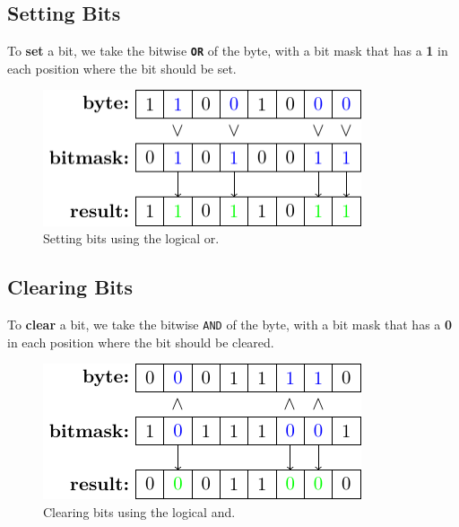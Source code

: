 \documentclass{report}
\newcommand{\keywordinline}[1]{\textcolor[rgb]{0.00,0.50,0.00}{\textbf{\texttt{#1}}}}
\begin{document}
\subsection{Setting Bits}
To \textbf{set} a bit, we take the bitwise \keywordinline{OR} of the byte, with a bit mask
that has a \textbf{1} in each position where the bit should be set.
\begin{figure}[H]
    \centering
    \includegraphics[height = 4cm, keepaspectratio = true]{figures/bit_set.pdf}
    \caption{Setting bits using the logical or.} %
\end{figure}
\subsection{Clearing Bits}
To \textbf{clear} a bit, we take the bitwise \texttt{AND} of the byte, with a bit mask
that has a \textbf{0} in each position where the bit should be cleared.
\begin{figure}[H]
    \centering
    \includegraphics[height = 4cm, keepaspectratio = true]{figures/bit_clear.pdf}
    \caption{Clearing bits using the logical and.} %
\end{figure}
\end{document}

